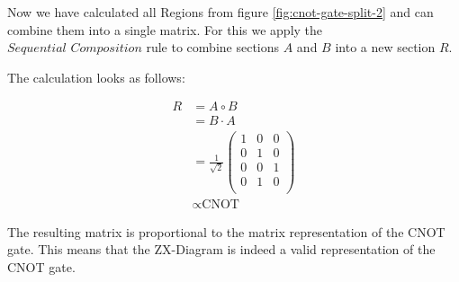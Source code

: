 Now we have calculated all Regions from figure \ref{fig:cnot-gate-split-2} and can combine them into a single matrix. For this we apply the $\textit{Sequential Composition}$ rule to combine sections $A$ and $B$ into a new section $R$.

The calculation looks as follows:


\begin{align*}
    R & = A \circ B         \\
      & = B \cdot A         \\
      & =
    \frac{1}{\sqrt{2}}
    \begin{pmatrix}
        1 & 0 & 0 \\
        0 & 1 & 0 \\
        0 & 0 & 1 \\
        0 & 1 & 0 \\
    \end{pmatrix}          \\
      & \propto \text{CNOT}
\end{align*}

The resulting matrix is proportional to the matrix representation of the CNOT gate. This means that the ZX-Diagram \zx{
    \zxNone{} \rar & \zxNone{} \rar  &\zxZ{}\rar  &\\
    \zxNone{} \rar & \zxX{} \rar \ar[ru]  &\rar& \\
} is indeed a valid representation of the CNOT gate.


